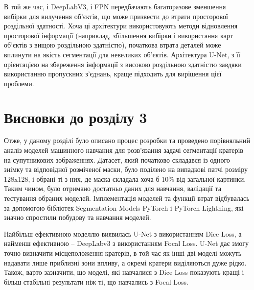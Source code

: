 В той же час, і DeepLabV3, і FPN передбачають багаторазове
зменшення вибірки для вилучення об'єктів, що може призвести
до втрати просторової роздільної здатності. Хоча ці
архітектури використовують методи відновлення просторової
інформації (наприклад, збільшення вибірки і використання
карт об'єктів з вищою роздільною здатністю), початкова
втрата деталей може вплинути на якість сегментації для
невеликих об'єктів. Архітектура U-Net, з її орієнтацією на
збереження інформації з високою роздільною здатністю завдяки
використанню пропускних з'єднань, краще підходить для
вирішення цієї проблеми.

\section*{Висновки до розділу 3}

Отже, у даному розділі було
описано процес розробки та проведено порівняльний аналіз
моделей машинного навчання для розв'язання задачі
сегментації кратерів на супутникових зображеннях.
Датасет, який початково
складався із одного знімку та відповідної розміченої маски, було
поділено на випадкові патчі розміру 128x128, і обрані ті з них,
де маска складала хоча б 10\% від загальної картинки.
Таким чином, було отримано достатньо даних для навчання, валідації та
тестування обраних моделей. Імплементація моделей та функції втрат відбувалась за допомогою
бібліотек Segmentation Models PyTorch і PyTorch Lightning, які
значно спростили побудову та навчання моделей.

Найбільш ефективною моделлю виявилась U-Net з використанням Dice Loss,
а найменш ефективною -- DeepLabv3 з використанням Focal Loss.
U-Net дає змогу точно визначити місцеположення кратерів, в той час
як інші дві моделі можуть надавати лише приблизні зони впливу,
а окремі кратери виділяються дуже рідко.
Також, варто зазначити, що моделі, які навчалися з Dice Loss
показують кращі і більш стабільні результати ніж ті,
що навчались з Focal Loss.